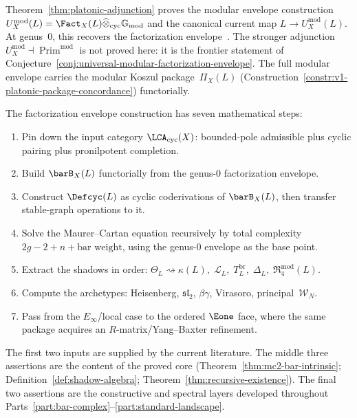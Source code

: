 \begin{remark}
\label{rem:concordance-platonic-adjunction}
Theorem~\ref{thm:platonic-adjunction} proves the modular envelope
construction
$U_X^{\mathrm{mod}}(L)=\Fact_X(L)\widehat\otimes_{\mathrm{cyc}}
\mathbb{G}_{\mathrm{mod}}$
and the canonical current map
$L \to U_X^{\mathrm{mod}}(L)$.
At genus~$0$, this recovers the factorization
envelope~\cite[\S3.7]{BD04}\cite{CG17,Vic25}. The stronger adjunction
$U_X^{\mathrm{mod}} \dashv \operatorname{Prim}^{\mathrm{mod}}$
is not proved here: it is the frontier statement of
Conjecture~\ref{conj:universal-modular-factorization-envelope}.
The full modular envelope carries
the modular Koszul package~$\Pi_X(L)$
(Construction~\ref{constr:v1-platonic-package-concordance}) functorially.
\end{remark}

\begin{remark}
\label{rem:envelope-execution-programme}
The factorization envelope construction has seven mathematical
steps:
\begin{enumerate}[label=\textup{(\arabic*)}]
\item Pin down the input category
 $\LCA_{\mathrm{cyc}}(X)$: bounded-pole admissible plus
 cyclic pairing plus pronilpotent completion.
\item Build $\barB_X(L)$ functorially from the genus-$0$
 factorization envelope.
\item Construct $\Defcyc(L)$ as cyclic coderivations of
 $\barB_X(L)$, then transfer stable-graph operations
 to it.
\item Solve the Maurer--Cartan equation recursively by
 total complexity $2g - 2 + n + \text{bar weight}$,
 using the genus-$0$ envelope as the base point.
\item Extract the shadows in order:
 $\Theta_L \rightsquigarrow
 \kappa(L),\; \mathcal{L}_L,\;
 T_L^{\mathrm{br}},\; \Delta_L,\;
 \mathfrak{R}_4^{\mathrm{mod}}(L)$.
\item Compute the archetypes:
 Heisenberg, $\widehat{\mathfrak{sl}}_2$,
 $\beta\gamma$, Virasoro,
 principal~$\mathcal{W}_N$.
\item Pass from the $E_\infty$/local case to the ordered
 $\Eone$ face, where the same package acquires an
 $R$-matrix/Yang--Baxter refinement.
\end{enumerate}
The first two inputs are supplied by the current literature.
The middle three assertions are the content of the proved core
(Theorem~\ref{thm:mc2-bar-intrinsic};
Definition~\ref{def:shadow-algebra};
Theorem~\ref{thm:recursive-existence}).
The final two assertions are the constructive and spectral layers
developed throughout Parts~\ref{part:bar-complex}--\ref{part:standard-landscape}.
\end{remark}


